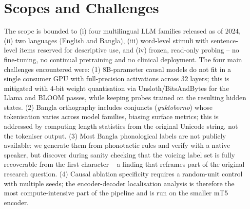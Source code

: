 \section{Scopes and Challenges}

The scope is bounded to (i) four multilingual LLM families released as of 2024, (ii) two languages (English and Bangla), (iii) word-level stimuli with sentence-level items reserved for descriptive use, and (iv) frozen, read-only probing -- no fine-tuning, no continual pretraining and no clinical deployment. The four main challenges encountered were: (1) 8B-parameter causal models do not fit in a single consumer GPU with full-precision activations across 32 layers; this is mitigated with 4-bit weight quantisation via Unsloth/BitsAndBytes \cite{dettmers2022bnb} for the Llama and BLOOM passes, while keeping probes trained on the resulting hidden states. (2) Bangla orthography includes conjuncts (\textit{yuktoborno}) whose tokenisation varies across model families, biasing surface metrics; this is addressed by computing length statistics from the original Unicode string, not the tokeniser output. (3) Most Bangla phonological labels are not publicly available; we generate them from phonotactic rules and verify with a native speaker, but discover during sanity checking that the voicing label set is fully recoverable from the first character -- a finding that reframes part of the original research question. (4) Causal ablation specificity requires a random-unit control with multiple seeds; the encoder-decoder localisation analysis is therefore the most compute-intensive part of the pipeline and is run on the smaller mT5 encoder.
